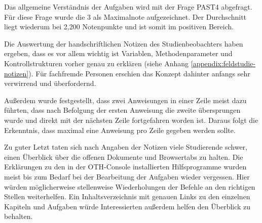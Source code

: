 Das allgemeine Verständnis der Aufgaben wird mit der Frage PAST4 abgefragt. Für
diese Frage wurde die 3 als Maximalnote aufgezeichnet. Der Durchschnitt liegt
wiederum bei 2,200 Notenpunkte und ist somit im positiven Bereich.

Die Auswertung der handschriftlichen Notizen des Studienbeobachters haben
ergeben, dass es vor allem wichtig ist Variablen, Methodenparameter und
Kontrollstrukturen vorher genau zu erklären (siehe Anhang
\ref{appendix:feldstudie-notizen}). Für fachfremde Personen erschien das Konzept
dahinter anfangs sehr verwirrend und überfordernd.

Außerdem wurde festgestellt, dass zwei Anweisungen in einer Zeile meist dazu
führten, dass nach Befolgung der ersten Anweisung die zweite übersprungen wurde
und direkt mit der nächsten Zeile fortgefahren worden ist. Daraus folgt die
Erkenntnis, dass maximal eine Anweisung pro Zeile gegeben werden sollte.

Zu guter Letzt taten sich nach Angaben der Notizen viele Studierende schwer,
einen Überblick über die offenen Dokumente und Browsertabs zu halten. Die
Erklärungen zu den in der OTH-Console installierten Hilfsprogramme wurden meist
bis zum Bedarf bei der Bearbeitung der Aufgaben wieder vergessen. Hier würden
möglicherweise stellenweise Wiederholungen der Befehle an den richtigen Stellen
weiterhelfen. Ein Inhaltsverzeichnis mit genauen Links zu den einzelnen Kapiteln
und Aufgaben würde Interessierten außerdem helfen den Überblick zu behalten.
